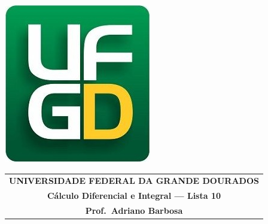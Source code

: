 \documentclass[a4paper,5pt]{amsbook}
\begin{document}
\thispagestyle{empty}
\pagestyle{empty}
\begin{minipage}[h]{0.14\textwidth}
	\includegraphics[scale=0.24]{../ufgd.png}
\end{minipage}
\begin{minipage}[h]{\textwidth}
\begin{tabular}{c}
{{\bf UNIVERSIDADE FEDERAL DA GRANDE DOURADOS}}\\
{{\bf C\'alculo Diferencial e Integral --- Lista 10}}\\
{{\bf Prof.\ Adriano Barbosa}}\\
\end{tabular}
\vspace{-0.45cm}
%
\end{minipage}

\end{document}
